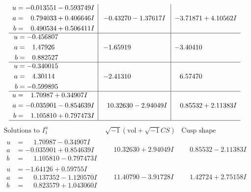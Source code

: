 \documentclass[1p]{elsarticle_modified}
\theoremstyle{definition}
\newcommand{\I}{\sqrt{-1}}
\begin{document}
$$\begin{array}{c|c|c}
\begin{aligned}
u &= -0.013551 - 0.593749 I \\
a &= \phantom{-}0.794033 + 0.406646 I \\
b &= \phantom{-}0.490534 + 0.506411 I\end{aligned}
 & -0.43270 - 1.37617 I & -3.71871 + 4.10562 I \\ \hline\begin{aligned}
u &= -0.456807\phantom{ +0.000000I} \\
a &= \phantom{-}1.47926\phantom{ +0.000000I} \\
b &= \phantom{-}0.882527\phantom{ +0.000000I}\end{aligned}
 & -1.65919\phantom{ +0.000000I} & -3.40410\phantom{ +0.000000I} \\ \hline\begin{aligned}
u &= -0.340015\phantom{ +0.000000I} \\
a &= \phantom{-}4.30114\phantom{ +0.000000I} \\
b &= -0.599895\phantom{ +0.000000I}\end{aligned}
 & -2.41310\phantom{ +0.000000I} & \phantom{-}6.57470\phantom{ +0.000000I} \\ \hline\begin{aligned}
u &= \phantom{-}1.70987 + 0.34907 I \\
a &= -0.035901 - 0.854639 I \\
b &= \phantom{-}1.105810 + 0.797473 I\end{aligned}
 & \phantom{-}10.32630 - 2.94049 I & \phantom{-}0.85532 + 2.11383 I\\
 \hline 
 \end{array}$$\newpage$$\begin{array}{c|c|c}  
\text{Solutions to }I^u_{1}& \I (\text{vol} + \sqrt{-1}CS) & \text{Cusp shape}\\
 \hline 
\begin{aligned}
u &= \phantom{-}1.70987 - 0.34907 I \\
a &= -0.035901 + 0.854639 I \\
b &= \phantom{-}1.105810 - 0.797473 I\end{aligned}
 & \phantom{-}10.32630 + 2.94049 I & \phantom{-}0.85532 - 2.11383 I \\ \hline\begin{aligned}
u &= -1.64126 + 0.59755 I \\
a &= \phantom{-}0.137352 - 1.120570 I \\
b &= \phantom{-}0.823579 + 1.043060 I\end{aligned}
 & \phantom{-}11.40790 - 3.91728 I & \phantom{-}1.42724 + 2.75158 I \\ \hline\begin{aligned}

\end{aligned}
\end{array}$$
\end{document}
